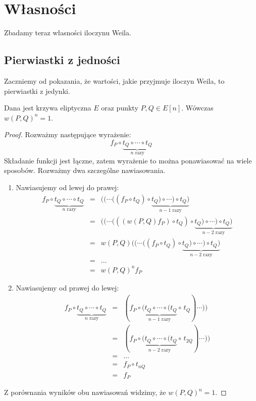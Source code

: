 \section{Własności}

Zbadamy teraz własności iloczynu Weila.

\subsection*{Pierwiastki z jedności}

Zaczniemy od pokazania, że wartości, jakie przyjmuje iloczyn Weila,
to pierwiastki z jedynki.

\begin{theorem}
Dana jest krzywa eliptyczna $E$ oraz punkty $P, Q \in E[n]$.
Wówczas $w(P,Q)^n = 1$.
\end{theorem}

\begin{proof}
Rozważmy następujące wyrażenie:
\begin{equation*}
f_P \circ \underbrace{t_Q \circ \cdots \circ t_Q}_{n\textrm{ razy}}
\end{equation*}
Składanie funkcji jest łączne,
zatem wyrażenie to można ponawiasować na wiele sposobów.
Rozważmy dwa szczególne nawiasowania.
\begin{enumerate}
\item
Nawiasujemy od lewej do prawej:
\begin{eqnarray*}
f_P \circ \underbrace{t_Q \circ \cdots \circ t_Q}_{n\textrm{ razy}}
& = & ((\cdots((f_P \circ t_Q) \circ
      \underbrace{t_Q) \circ \cdots ) \circ t_Q)}_{n-1\textrm{ razy}} \\
& = & ((\cdots(((w(P,Q)f_P) \circ t_Q) \circ
      \underbrace{t_Q) \circ \cdots ) \circ t_Q)}_{n-2\textrm{ razy}} \\
& = & w(P,Q)((\cdots((f_P \circ t_Q) \circ
      \underbrace{t_Q) \circ \cdots ) \circ t_Q)}_{n-2\textrm{ razy}} \\
& = & \ldots \\
& = & w(P,Q)^nf_P
\end{eqnarray*}
\item
Nawiasujemy od prawej do lewej:
\begin{eqnarray*}
f_P \circ \underbrace{t_Q \circ \cdots \circ t_Q}_{n\textrm{ razy}}
& = & (f_P \circ
      \underbrace{(t_Q \circ \cdots \circ (t_Q}_{n-1\textrm{ razy}}
      \circ\,t_Q)\cdots)) \\
& = & (f_P \circ
      \underbrace{(t_Q \circ \cdots \circ (t_Q}_{n-2\textrm{ razy}}
      \circ\,t_{2Q})\cdots)) \\
& = & \ldots \\
& = & f_P \circ t_{nQ} \\
& = & f_P
\end{eqnarray*}
\end{enumerate}
Z porównania wyników obu nawiasowań widzimy, że $w(P,Q)^n = 1$.
\end{proof}

